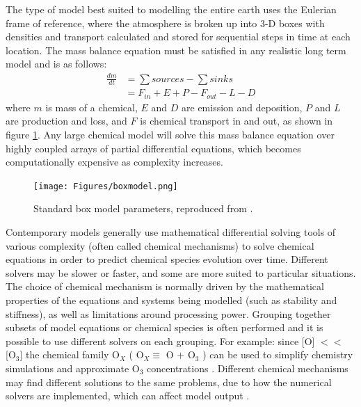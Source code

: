     
    The type of model best suited to modelling the entire earth uses the Eulerian frame of reference, where the atmosphere is broken up into 3-D boxes with densities and transport calculated and stored for sequential steps in time at each location.
    The mass balance equation must be satisfied in any realistic long term model and is as follows: 
    \begin{align*}
      \frac{dm}{dt} & = \sum{sources}-\sum{sinks} \\
                    & = F_{in} + E + P - F_{out} - L - D 
    \end{align*}
    where $m$ is mass of a chemical, $E$ and $D$ are emission and deposition, $P$ and $L$ are production and loss, and $F$ is chemical transport in and out, as shown in figure \ref{LR:Models:fig_boxmodel}.
    Any large chemical model will solve this mass balance equation over highly coupled arrays of partial differential equations, which becomes computationally expensive as complexity increases.
    
    \begin{figure}
      \texttt{[image: Figures/boxmodel.png]}
      \caption{ %
        Standard box model parameters, reproduced from \textcite{Jacob_1999_book}. }
      \label{LR:Models:fig_boxmodel}
    \end{figure}
    
    Contemporary models generally use mathematical differential solving tools of various complexity (often called chemical mechanisms) to solve chemical equations in order to predict chemical species evolution over time.
    Different solvers may be slower or faster, and some are more suited to particular situations.
    The choice of chemical mechanism is normally driven by the mathematical properties of the equations and systems being modelled (such as stability and stiffness), as well as limitations around processing power.
    Grouping together subsets of model equations or chemical species is often performed and it is possible to use different solvers on each grouping.
    For example: since [O] $<<$ [O$_3$] the chemical family O$_X$ (  O$_X \equiv $ O $+$ O$_3$ ) can be used to simplify chemistry simulations and approximate O$_3$ concentrations \parencite[][Chapter 3]{BrasseurJacob2017}.
    Different chemical mechanisms may find different solutions to the same problems, due to how the numerical solvers are implemented, which can affect model output \parencite{Zhang2012}.
    
